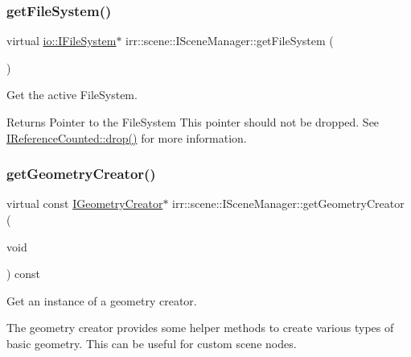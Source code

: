 \subsubsection{\texorpdfstring{get\+File\+System()}{getFileSystem()}\hspace{0.1cm}{\footnotesize\ttfamily [2/2]}}
{\footnotesize\ttfamily virtual \hyperlink{classirr_1_1io_1_1IFileSystem}{io\+::\+I\+File\+System}$\ast$ irr\+::scene\+::\+I\+Scene\+Manager\+::get\+File\+System (\begin{DoxyParamCaption}{ }\end{DoxyParamCaption})\hspace{0.3cm}{\ttfamily [pure virtual]}}



Get the active File\+System. 

\begin{DoxyReturn}{Returns}
Pointer to the File\+System This pointer should not be dropped. See \hyperlink{classirr_1_1IReferenceCounted_a03856a09355b89d178090c4a5f738543}{I\+Reference\+Counted\+::drop()} for more information. 
\end{DoxyReturn}
\mbox{\label{classirr_1_1scene_1_1ISceneManager_a9840cfd39b44f238d06b7bc51e6ba1f6}} 
\subsubsection{\texorpdfstring{get\+Geometry\+Creator()}{getGeometryCreator()}\hspace{0.1cm}{\footnotesize\ttfamily [1/2]}}
{\footnotesize\ttfamily virtual const \hyperlink{classirr_1_1scene_1_1IGeometryCreator}{I\+Geometry\+Creator}$\ast$ irr\+::scene\+::\+I\+Scene\+Manager\+::get\+Geometry\+Creator (\begin{DoxyParamCaption}\item[{void}]{ }\end{DoxyParamCaption}) const\hspace{0.3cm}{\ttfamily [pure virtual]}}



Get an instance of a geometry creator. 

The geometry creator provides some helper methods to create various types of basic geometry. This can be useful for custom scene nodes. \mbox{\label{classirr_1_1scene_1_1ISceneManager_a9840cfd39b44f238d06b7bc51e6ba1f6}} 
